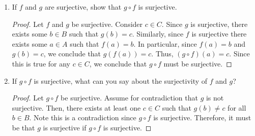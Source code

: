 \documentclass[12pt]{article}
\begin{document}
\begin{enumerate}[label=(\alph*)]
\begin{proof}
		Note that $g$ can either be injective or non-injective. If $g$ is injective it 
		still holds that $g \circ f$ is injective by problem (b). Thus, assume $g$ is 
		non-injective. Consider $g(f(a))$ and $g(f(a'))$ such that 
		$g(f(a)) = g(f(a'))$ for $a, a' \in A$. Since $f$ is injective, if $a = a'$ 
		we have that $f(a) = f(a')$ and therefore injectivity of $g \circ f$ still holds.
		If $a \neq a'$, it must be that $f(a) \neq f(a')$. Since $g$ is non-injective
		it is possible for $g(f(a)) = g(f(a'))$. Thus, the injectivity of $g \circ f$
		will still hold. Therefore, since $g \circ f$ can be injective when $g$ is either
		injective or non-injective, we conclude that the injectivity of $g \circ f$
		does not allow us to say anything about the injectivity of $g$.
	\end{proof}
	\item If $f$ and $g$ are surjective, show that $g \circ f$ is surjective.
	\begin{proof}
		Let $f$ and $g$ be surjective. Consider $c \in C$. Since $g$ is surjective, there
		exists some $b \in B$ such that $g(b) = c$. Similarly, since $f$ is surjective
		there exists some $a \in A$ such that $f(a) = b$. In particular, since $f(a) = b$
		and $g(b) = c$, we conclude that $g(f(a)) = c$. Thus, $(g \circ f)(a) = c$.
		Since this is true for any $c \in C$, we conclude that $g \circ f$ must be 
		surjective.
	\end{proof}
	\item If $g \circ f$ is surjective, what can you say about the surjectivity of 
	$f$ and $g$?
	\begin{proof}
		Let $g \circ f$ be surjective. Assume for contradiction that $g$ is not 
		surjective. Then, there exists at least one $c \in C$ such that $g(b) \neq c$
		for all $b \in B$. Note this is a contradiction since $g \circ f$ is surjective.
		Therefore, it must be that $g$ is surjective if $g \circ f$ is surjective.
		

\end{proof}
\end{enumerate}
\end{document}

